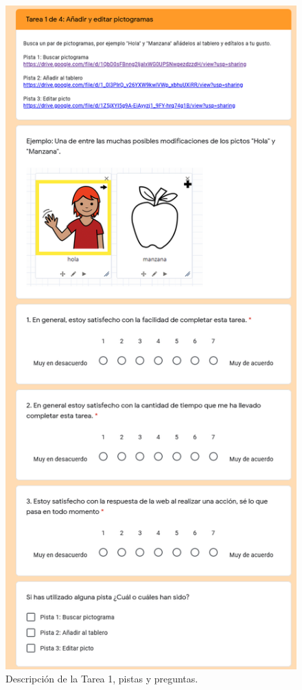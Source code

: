 \begin{figure}[h!]
	\centering
	\includegraphics[width=0.78\linewidth]{Imagenes/Bitmap/Tarea1Preguntas}
	\caption{Descripción de la Tarea 1, pistas y preguntas.}
	\label{fig:tarea1preguntas}
\end{figure}


